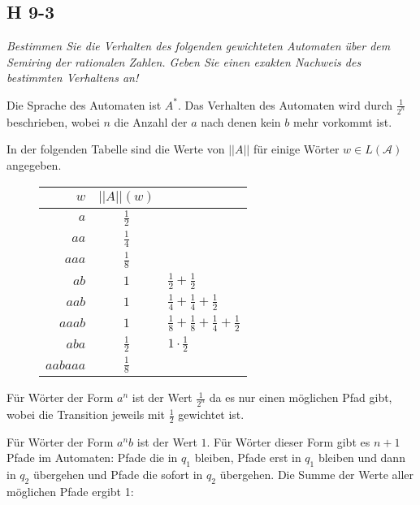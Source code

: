 \documentclass{scrartcl}
\begin{document}
\subsection{H 9-3}

\textsl{Bestimmen Sie die Verhalten des folgenden gewichteten Automaten über dem \emph{Semiring der rationalen Zahlen}. Geben Sie einen exakten Nachweis des bestimmten Verhaltens an!}

Die Sprache des Automaten ist $A^*$. Das Verhalten des Automaten wird durch $\frac{1}{2^n}$ beschrieben, wobei $n$ die Anzahl der $a$ nach denen kein $b$ mehr vorkommt ist.

In der folgenden Tabelle sind die Werte von $||A||$ für einige Wörter $w \in L(\mathcal{A})$ angegeben.

\begin{figure}[h]
  \centering
  \begin{tabular}{r|c|l}
    $w$   & $||A||(w)$ & \\
    \hline

    $a$      & $\frac{1}{2}$ \\
    $aa$     & $\frac{1}{4}$ \\
    $aaa$    & $\frac{1}{8}$ \\
    $ab$     & $1$           & $\frac{1}{2} + \frac{1}{2}$ \\
    $aab$    & $1$           & $\frac{1}{4} + \frac{1}{4} + \frac{1}{2}$ \\
    $aaab$   & $1$           & $\frac{1}{8} + \frac{1}{8} + \frac{1}{4} + \frac{1}{2}$ \\
    $aba$    & $\frac{1}{2}$ & $1 \cdot \frac{1}{2}$ \\
    $aabaaa$ & $\frac{1}{8}$ \\
  \end{tabular}
\end{figure}

Für Wörter der Form $a^n$ ist der Wert $\frac{1}{2^n}$ da es nur einen möglichen Pfad gibt, wobei die Transition jeweils mit $\frac{1}{2}$ gewichtet ist.

Für Wörter der Form $a^nb$ ist der Wert $1$. Für Wörter dieser Form gibt es $n+1$ Pfade im Automaten: Pfade die in $q_1$ bleiben, Pfade erst in $q_1$ bleiben und dann in $q_2$ übergehen und Pfade die sofort in $q_2$ übergehen. Die Summe der Werte aller möglichen Pfade ergibt 1:

\end{document}
